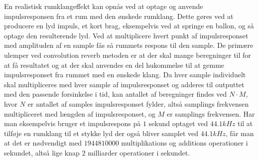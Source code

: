 En realistisk rumklangeffekt kan opnås ved at optage og anvende impulsresponsen fra et rum med den ønskede rumklang.
Dette gøres ved at producere en lyd impuls, et kort brag, eksempelvis ved at springe en ballon, og så optage den resulterende lyd. 
Ved at multiplicere hvert punkt af impulsresponset med amplituden af en sample fås så rummets respons til den sample.
De primære ulemper ved convolution reverb metoden er at der skal mange beregninger til for at få resultatet og at der skal anvendes en del hukommelse til at gemme impulsresponset fra rummet med en ønskede klang.
Da hver sample individuelt skal multipliceres med hver sample af impulsresponset og adderes til outputtet med den passende forsinkelse i tid, kan antallet af beregninger findes ved $N \cdot M$, hvor $N$ er antallet af samples impulsresponset fylder, altså samplings frekvensen multipliceret med længden af impulsresponset, og $M$ er samplings frekvensen.
Har man eksempelvis bruger et impulsrespons på $1$ sekund optaget ved $44.1\si{kHz}$ til at tilføje en rumklang til et stykke lyd der også bliver samplet ved $44.1\si{kHz}$, får man at det er nødvendigt med $1944810000$ multiplikations og additions  operationer i sekundet, altså lige knap $2$ milliarder operationer i sekundet. 

